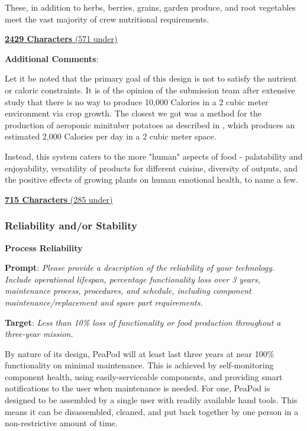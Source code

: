 \documentclass{report}
\begin{document}
These, in addition to herbs, berries, grains, garden produce, and root vegetables meet the vast majority of crew nutritional requirements.

\uline{\textbf{2429 Characters} (571 under)}

\vspace{0.5cm}

\textbf{Additional Comments}:

Let it be noted that the primary goal of this design is not to satisfy the nutrient or caloric constraints. It is of the opinion of the submission team after extensive study that there is no way to produce 10,000 Calories in a 2 cubic meter environment via crop growth. The closest we got was a method for the production of aeroponic minituber potatoes as described in \cite{minituber}, which produces an estimated 2,000 Calories per day in a 2 cubic meter space.

Instead, this system caters to the more "human" aspects of food - palatability and enjoyability, versatility of products for different cuisine, diversity of outputs, and the positive effects of growing plants on human emotional health, to name a few.

\uline{\textbf{715 Characters} (285 under)}

\newpage

\subsubsection{Reliability and/or Stability}

\textbf{Process Reliability}
\label{sec:reliability-process}

\textbf{Prompt}: \textit{Please provide a description of the reliability of your technology. Include operational lifespan, percentage functionality loss over 3 years, maintenance process, procedures, and schedule, including component maintenance/replacement and spare part requirements.}

\textbf{Target}: \textit{Less than 10\% loss of functionality or food production throughout a three-year mission.}


By nature of its design, PeaPod will at least last three years at near 100\% functionality on minimal maintenance. This is achieved by self-monitoring component health, using easily-serviceable components, and providing smart notifications to the user when maintenance is needed.
For one, PeaPod is designed to be assembled by a single user with readily available hand tools. This means it can be disassembled, cleaned, and put back together by one person in a non-restrictive amount of time.
\end{document}
